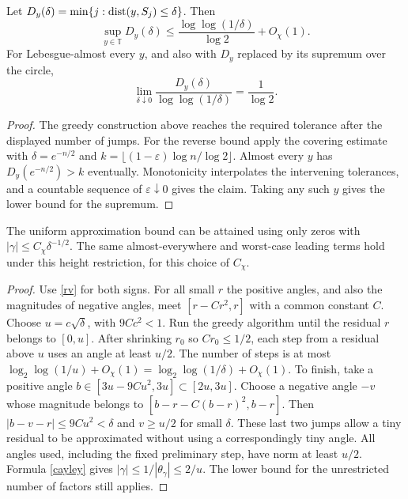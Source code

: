 \documentclass[11pt,letterpaper]{article}
\theoremstyle{plain}
\theoremstyle{definition}\newtheorem{example}[theorem]{Example}
\begin{document}
\begin{corollary}
Let $D_y(\delta)=\min\{j:\operatorname{dist}(y,S_j)\le\delta\}$. Then
\[
 \sup_{y\in\mathbb T}D_y(\delta)\le
 \frac{\log\log(1/\delta)}{\log2}+O_\chi(1).
\]
For Lebesgue-almost every $y$, and also with $D_y$ replaced by its
supremum over the circle,
\[
 \lim_{\delta\downarrow0}
 \frac{D_y(\delta)}{\log\log(1/\delta)}=\frac1{\log2}.
\]
\end{corollary}
\begin{proof}
The greedy construction above reaches the required tolerance after the
displayed number of jumps. For the reverse bound apply the covering
estimate with $\delta=e^{-n/2}$ and
$k=\lfloor(1-\varepsilon)\log n/\log 2\rfloor$.
Almost every $y$ has $D_y(e^{-n/2})>k$ eventually. Monotonicity
interpolates the intervening tolerances, and a countable sequence of
$\varepsilon\downarrow0$ gives the claim. Taking any such $y$ gives
the lower bound for the supremum.
\end{proof}

\begin{corollary}\label{heightcap}
The uniform approximation bound can be attained using only zeros with
$|\gamma|\le C_\chi\delta^{-1/2}$. The same almost-everywhere and worst-case
leading terms hold under this height restriction, for this choice of $C_\chi$.
\end{corollary}
\begin{proof}
Use \eqref{rv} for both signs. For all small $r$ the positive angles, and
also the magnitudes of negative angles, meet $[r-Cr^2,r]$ with a common
constant $C$. Choose $u=c\sqrt\delta$, with $9Cc^2<1$. Run the greedy
algorithm until the residual $r$ belongs to $[0,u]$. After shrinking
$r_0$ so $Cr_0\le1/2$, each step from a residual above $u$ uses an angle
at least $u/2$. The number of steps is at most
$\log_2\log(1/u)+O_\chi(1)=\log_2\log(1/\delta)+O_\chi(1)$.
To finish, take a positive angle $b\in[3u-9Cu^2,3u]\subset[2u,3u]$.
Choose a negative angle $-v$ whose magnitude belongs to
$[b-r-C(b-r)^2,b-r]$. Then $|b-v-r|\le9Cu^2<\delta$ and $v\ge u/2$
for small $\delta$. These last two jumps allow a tiny residual to be
approximated without using a correspondingly tiny angle. All angles used,
including the fixed preliminary step, have norm at least $u/2$. Formula
\eqref{cayley} gives $|\gamma|\le1/|\theta_\gamma|\le2/u$. The lower
bound for the unrestricted number of factors still applies.
\end{proof}
\end{document}
